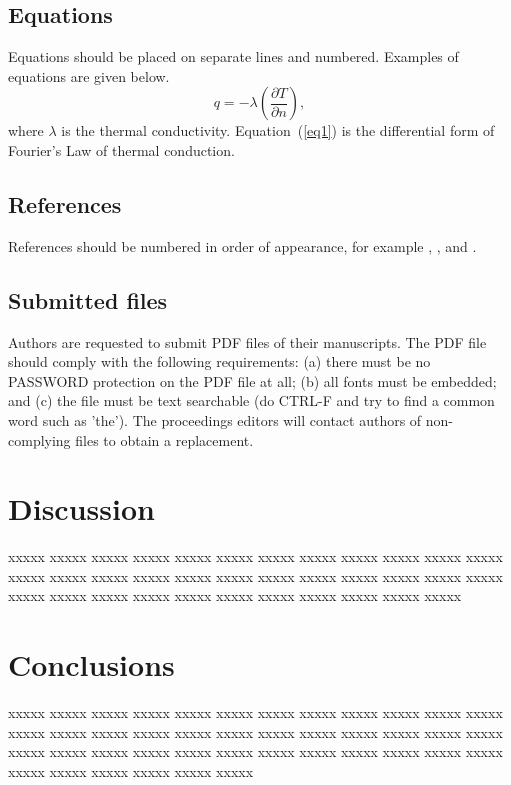 \documentclass{article}
\begin{document}
\subsection{Equations}

Equations should be placed on separate lines and numbered. 
Examples of equations are given below.
\begin{equation}
q=-\lambda \left( \frac{\partial T}{\partial n} \right),
\label{eq1}
\end{equation}
where $\lambda$ is the thermal conductivity.
Equation~(\ref{eq1}) is the differential form of Fourier's Law of thermal conduction.

\subsection{References}

References should be numbered in order of appearance, for example \cite{Zhang10}, \cite{Patankar80}, and \cite{Kays90,Kawa09}. 

\subsection{Submitted files}
Authors are requested to submit PDF files of their manuscripts. 
The PDF file should comply with the following requirements: 
(a) there must be no PASSWORD protection on the PDF file at all; 
(b) all fonts must be embedded; 
and (c) the file must be text searchable (do CTRL-F and try to find a common word such as 'the'). 
The proceedings editors will contact authors of non-complying files to obtain a replacement.

\section{Discussion}

xxxxx xxxxx xxxxx xxxxx xxxxx xxxxx xxxxx
xxxxx xxxxx xxxxx xxxxx xxxxx xxxxx xxxxx
xxxxx xxxxx xxxxx xxxxx xxxxx xxxxx xxxxx
xxxxx xxxxx xxxxx xxxxx xxxxx xxxxx xxxxx
xxxxx xxxxx xxxxx xxxxx xxxxx xxxxx xxxxx

\section{Conclusions}

xxxxx xxxxx xxxxx xxxxx xxxxx xxxxx xxxxx
xxxxx xxxxx xxxxx xxxxx xxxxx xxxxx xxxxx
xxxxx xxxxx xxxxx xxxxx xxxxx xxxxx xxxxx
xxxxx xxxxx xxxxx xxxxx xxxxx xxxxx xxxxx
xxxxx xxxxx xxxxx xxxxx xxxxx xxxxx xxxxx
xxxxx xxxxx xxxxx xxxxx xxxxx xxxxx xxxxx
\end{document}
